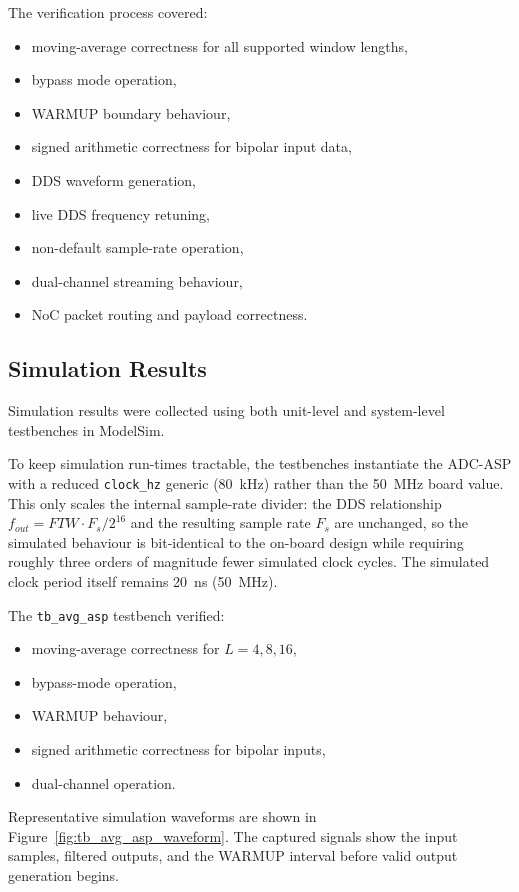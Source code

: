 \documentclass[10pt, a4paper]{article}
\begin{document}
The verification process covered:

\begin{itemize}
    \item moving-average correctness for all supported window lengths,
    \item bypass mode operation,
    \item WARMUP boundary behaviour,
    \item signed arithmetic correctness for bipolar input data,
    \item DDS waveform generation,
    \item live DDS frequency retuning,
    \item non-default sample-rate operation,
    \item dual-channel streaming behaviour,
    \item NoC packet routing and payload correctness.
\end{itemize}

\subsection{Simulation Results}

Simulation results were collected using both unit-level and system-level testbenches in ModelSim.

To keep simulation run-times tractable, the testbenches instantiate the ADC-ASP with a reduced \texttt{clock\_hz} generic (80~kHz) rather than the 50~MHz board value. This only scales the internal sample-rate divider: the DDS relationship $f_{out}=FTW\cdot F_s/2^{16}$ and the resulting sample rate $F_s$ are unchanged, so the simulated behaviour is bit-identical to the on-board design while requiring roughly three orders of magnitude fewer simulated clock cycles. The simulated clock period itself remains 20~ns (50~MHz).

The \texttt{tb\_avg\_asp} testbench verified:

\begin{itemize}
    \item moving-average correctness for $L=4,8,16$,
    \item bypass-mode operation,
    \item WARMUP behaviour,
    \item signed arithmetic correctness for bipolar inputs,
    \item dual-channel operation.
\end{itemize}

Representative simulation waveforms are shown in Figure~\ref{fig:tb_avg_asp_waveform}. The captured signals show the input samples, filtered outputs, and the WARMUP interval before valid output generation begins.
\end{document}
